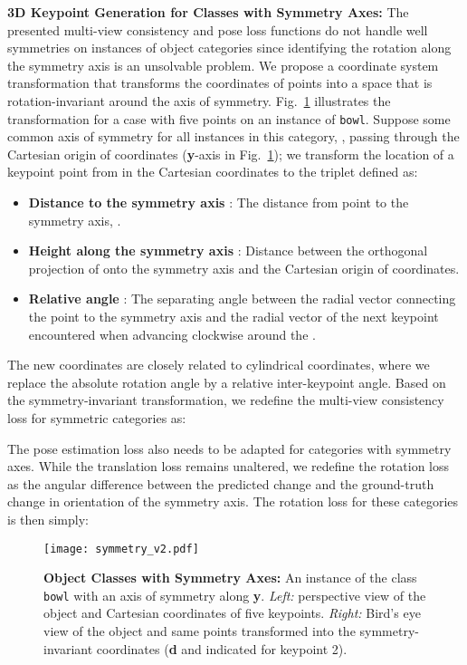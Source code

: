 \documentclass[letterpaper, 10 pt, conference]{ieeeconf}
\begin{document}
\textbf{3D Keypoint Generation for Classes with Symmetry Axes:} The presented multi-view consistency and pose loss functions do not handle well symmetries on instances of object categories since identifying the rotation along the symmetry axis is an unsolvable problem. We propose a coordinate system transformation  that transforms the coordinates of points into a space that is rotation-invariant around the axis of symmetry. Fig.~\ref{fig:symmetry} illustrates the transformation for a case with five points on an instance of \texttt{bowl}. Suppose some common axis of symmetry for all instances in this category, , passing through the Cartesian origin of coordinates (\textbf{y}-axis in Fig.~\ref{fig:symmetry}); we transform the location of a keypoint point  from  in the Cartesian coordinates to the triplet  defined as:
\begin{itemize}
    \item \textbf{Distance to the symmetry axis }: The distance from  point to the symmetry axis, .
    \item \textbf{Height along the symmetry axis }: Distance between the orthogonal projection of  onto the symmetry axis and the Cartesian origin of coordinates.
    \item \textbf{Relative angle }: The separating angle between the radial vector connecting the point  to the symmetry axis and the radial vector of the next keypoint encountered when advancing clockwise around the .
\end{itemize}

The new coordinates are closely related to cylindrical coordinates, where we replace the absolute rotation angle by a relative inter-keypoint angle. Based on the symmetry-invariant transformation, we redefine the multi-view consistency loss for symmetric categories as:



The pose estimation loss also needs to be adapted for categories with symmetry axes. While the translation loss remains unaltered, we redefine the rotation loss as the angular difference between the predicted change  and the ground-truth change  in orientation of the symmetry axis. The rotation loss for these categories is then simply:



\begin{figure}[t]
\center
\texttt{[image: symmetry\_v2.pdf]}
\label{fig:symmetry}
\vspace{-3mm}
\caption{\textbf{Object Classes with Symmetry Axes:} An instance of the class \texttt{bowl} with an axis of symmetry along \textbf{y}. \textit{Left:} perspective view of the object and Cartesian coordinates of five keypoints. \textit{Right:} Bird's eye view of the object and same points transformed into the symmetry-invariant coordinates (\textbf{d} and \textbf{} indicated for keypoint 2).}
\vspace{-4mm}
\end{figure}
\end{document}
